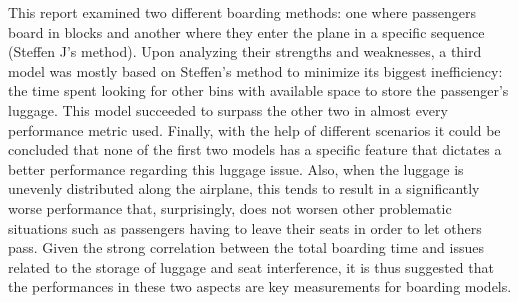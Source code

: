 This report examined two different boarding methods: one where passengers board in blocks and another where they enter the plane in a specific sequence (Steffen J's method). Upon analyzing their strengths and weaknesses, a third model was mostly based on Steffen's method to minimize its biggest inefficiency: the time spent looking for other bins with available space to store the passenger's luggage. This model succeeded to surpass the other two in almost every performance metric used.
Finally, with the help of different scenarios it could be concluded that none of the first two models has a specific feature that dictates a better performance regarding this luggage issue. Also, when the luggage is unevenly distributed along the airplane, this tends to result in a significantly worse performance that, surprisingly, does not worsen other problematic situations such as passengers having to leave their seats in order to let others pass.
Given the strong correlation between the total boarding time and issues related to the storage of luggage and seat interference, it is thus suggested that the performances in these two aspects are key measurements for boarding models.

